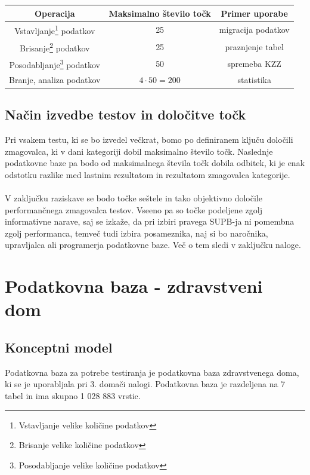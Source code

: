 \documentclass[a4paper,11pt]{report}
\begin{document}
\begin{center}
   \begin{tabular}{||c|c|c||}
      \hline
      \textbf{Operacija} & \textbf{Maksimalno število točk} & \textbf{Primer uporabe}\\
      \hline
      \hline
      Vstavljanje\footnote{Vstavljanje velike količine podatkov} podatkov & 25 & migracija podatkov\\
      Brisanje\footnote{Brisanje velike količine podatkov} podatkov & 25 & praznjenje tabel\\
      Posodabljanje\footnote{Posodabljanje velike količine podatkov} podatkov & 50 & spremeba KZZ \\
      Branje, analiza podatkov & \(4 \cdot 50 = 200\) & statistika\\
      \hline
   \end{tabular}
\end{center}

\section{Način izvedbe testov in določitve točk}
Pri vsakem testu, ki se bo izvedel večkrat, bomo po definiranem ključu določili zmagovalca, ki v dani kategoriji dobil maksimalno število točk. Naslednje podatkovne baze pa bodo od maksimalnega števila točk dobila odbitek, ki je enak odstotku razlike med lastnim rezultatom in rezultatom zmagovalca kategorije. 
\\\\
V zaključku raziskave se bodo točke seštele in tako objektivno določile performančnega zmagovalca testov. Vseeno pa so točke podeljene zgolj informativne narave, saj se izkaže, da pri izbiri pravega SUPB-ja ni pomembna zgolj performanca, temveč tudi izbira posameznika, naj si bo naročnika, upravljalca ali programerja podatkovne baze. Več o tem sledi v zaključku naloge. 

\chapter{Podatkovna baza - zdravstveni dom}


\section{Konceptni model}
Podatkovna baza za potrebe testiranja je podatkovna baza zdravstvenega doma, ki se je uporabljala pri 3. domači nalogi.
Podatkovna baza je razdeljena na 7 tabel in ima skupno 1 028 883 vrstic.
\end{document}
